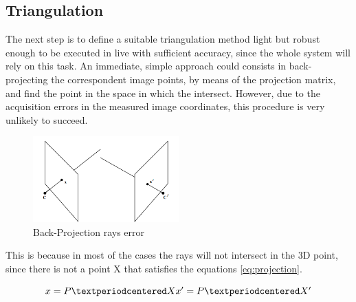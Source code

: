 \subsection{Triangulation}
The next step is to define a suitable triangulation method light but robust enough to be executed in live with sufficient accuracy, since the whole system will rely on this task. 
An immediate, simple approach could consists in back-projecting the correspondent image points, by means of the projection matrix, and find the point in the space in which the intersect. However, due to the acquisition errors in the measured image coordinates, this procedure is very unlikely to succeed. 

\begin{figure}[h]
    \centering
    \includegraphics[width=0.5\textwidth]{images/Back-Projection}
    \caption{Back-Projection rays error}
    \label{fig:Back-Projection}
\end{figure}

This is because in most of the cases the rays will not intersect in the 3D point, since there is not a point X that satisfies the equations \ref{eq:projection}. 

\begin{equation}
	\centering
	x  = P·X  $$\\
	x' = P·X' $$
	\label{eq:projection}
\end{equation} 










